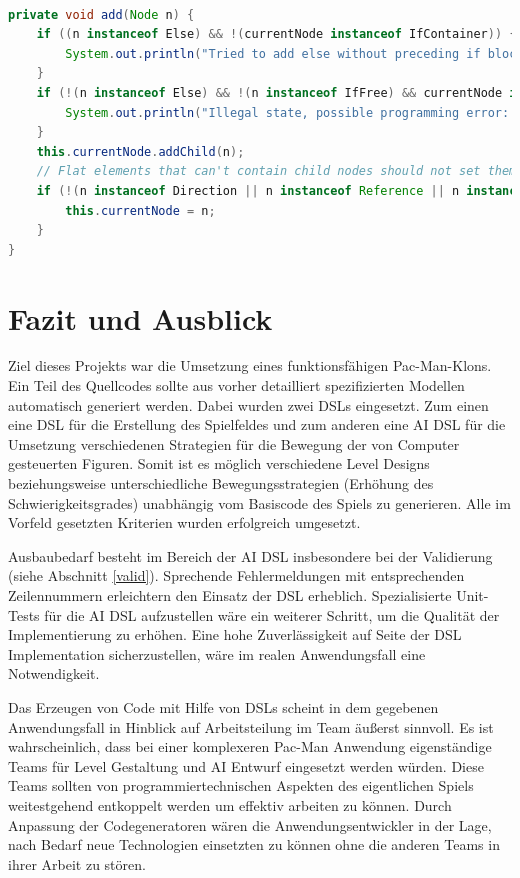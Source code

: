 \documentclass[conference]{IEEEtran}
\begin{document}
\begin{lstlisting}[language=Java, captionpos=b, caption=Grundliegende Validierung beim Hinzufügen eines  \texttt{Node} in \texttt{AiBaseListenerImplementation}, label=validation_intent]

private void add(Node n) {
    if ((n instanceof Else) && !(currentNode instanceof IfContainer)) {
        System.out.println("Tried to add else without preceding if block");
    }
    if (!(n instanceof Else) && !(n instanceof IfFree) && currentNode instanceof IfContainer) {
        System.out.println("Illegal state, possible programming error: Opened an IfContainer and trying to add other than if or else block.");
    }
    this.currentNode.addChild(n);
    // Flat elements that can't contain child nodes should not set themselves as currentNode
    if (!(n instanceof Direction || n instanceof Reference || n instanceof Assignment)) {
        this.currentNode = n;
    }
}

\end{lstlisting}


\section{Fazit und Ausblick}
Ziel dieses Projekts war die Umsetzung eines funktionsfähigen Pac-Man-Klons. Ein Teil des Quellcodes sollte aus vorher detailliert spezifizierten Modellen automatisch generiert werden.  Dabei wurden zwei DSLs eingesetzt. Zum einen eine DSL für die Erstellung des Spielfeldes und zum anderen eine AI DSL für die Umsetzung verschiedenen Strategien für die Bewegung der von Computer gesteuerten Figuren. Somit ist es möglich verschiedene Level Designs beziehungsweise unterschiedliche Bewegungsstrategien (Erhöhung des Schwierigkeitsgrades) unabhängig vom Basiscode des Spiels zu generieren. Alle im Vorfeld gesetzten Kriterien wurden erfolgreich umgesetzt.

Ausbaubedarf besteht im Bereich der AI DSL insbesondere bei der Validierung (siehe Abschnitt \ref{valid}). Sprechende Fehlermeldungen mit entsprechenden Zeilennummern erleichtern den Einsatz der DSL erheblich. Spezialisierte Unit-Tests für die AI DSL aufzustellen wäre ein weiterer Schritt, um die Qualität der Implementierung zu erhöhen. Eine hohe Zuverlässigkeit auf Seite der DSL Implementation sicherzustellen, wäre im realen Anwendungsfall eine Notwendigkeit.

Das Erzeugen von Code mit Hilfe von DSLs scheint in dem gegebenen Anwendungsfall in Hinblick auf Arbeitsteilung im Team äußerst sinnvoll. Es ist wahrscheinlich, dass bei einer komplexeren Pac-Man Anwendung eigenständige Teams für Level Gestaltung und AI Entwurf eingesetzt werden würden. Diese Teams sollten von programmiertechnischen Aspekten des eigentlichen Spiels weitestgehend entkoppelt werden um effektiv arbeiten zu können. Durch Anpassung der Codegeneratoren wären die Anwendungsentwickler in der Lage, nach Bedarf neue Technologien einsetzten zu können ohne die anderen Teams in ihrer Arbeit zu stören.
\end{document}
